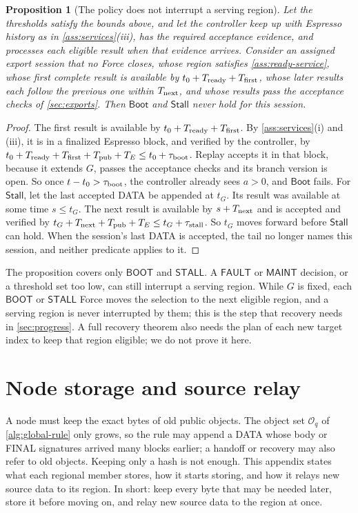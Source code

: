 \documentclass[11pt,a4paper]{article}
\newcommand{\tagg}[1]{\ensuremath{\mathsf{#1}}}
\newtheorem{proposition}[proposition]{Proposition}
\begin{document}
\begin{proposition}[The policy does not interrupt a serving region]
\label{prop:policy-noninterference}
Let the thresholds satisfy the bounds above, and let the controller keep
up with Espresso history as in \cref{ass:services}(iii), has the
required acceptance evidence, and processes each eligible result when
that evidence arrives. Consider an assigned export session that no
Force closes, whose region satisfies
\cref{ass:ready-service}, whose first complete result is available by
$t_0+T_{\rm ready}+T_{\rm first}$, whose later results each follow the
previous one within $T_{\rm next}$, and whose results pass the
acceptance checks of \cref{sec:exports}. Then $\tagg{Boot}$ and
$\tagg{Stall}$ never hold for this session.
\end{proposition}
\begin{proof}
The first result is available by $t_0+T_{\rm ready}+T_{\rm first}$. By
\cref{ass:services}(i) and (iii), it is in a finalized Espresso block,
and verified by the controller, by
$t_0+T_{\rm ready}+T_{\rm first}+T_{\rm pub}+T_E\le
t_0+\tau_{\rm boot}$. Replay accepts it in that block, because
it extends $G$, passes the acceptance checks and its branch version is
open. So once $t-t_0>\tau_{\rm boot}$, the controller already
sees $a>0$, and $\tagg{Boot}$ fails. For $\tagg{Stall}$, let the last
accepted DATA be appended at $t_G$. Its result was available at some
time $s\le t_G$. The next result is available by $s+T_{\rm next}$ and is
accepted and verified by $t_G+T_{\rm next}+T_{\rm pub}+T_E\le
t_G+\tau_{\rm stall}$. So $t_G$ moves forward before $\tagg{Stall}$ can
hold. When the session's last DATA is accepted, the tail no longer names
this session, and neither predicate applies to it.
\end{proof}

The proposition covers only \tagg{BOOT} and \tagg{STALL}. A \tagg{FAULT}
or \tagg{MAINT} decision, or a threshold set too low, can still
interrupt a serving region. While $G$ is fixed, each \tagg{BOOT} or
\tagg{STALL} Force moves the selection to the next eligible region, and
a serving region is never interrupted by them; this is the step that
recovery needs in \cref{sec:progress}. A full recovery theorem also needs
the plan of each new target index to keep that region eligible; we
do not prove it here.

\section{Node storage and source relay}
\label{app:storage}
\label{sec:source-step}
\label{sec:source-retention}
A node must keep the exact bytes of old public objects. The object set
$\mathcal O_q$ of \cref{alg:global-rule} only grows, so the rule may
append a DATA whose body or FINAL signatures arrived many blocks
earlier; a handoff or recovery may also refer to old objects. Keeping
only a hash is not enough. This appendix states what each regional
member stores, how it starts storing, and how it relays new source data
to its region. In short: keep every byte that may be needed later, store
it before moving on, and relay new source data to the region at once.
\end{document}
